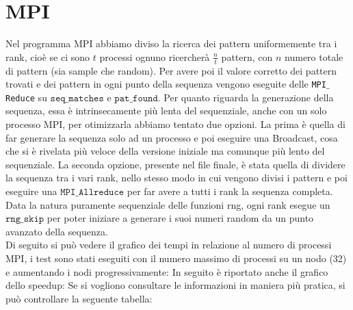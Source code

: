 \documentclass[12pt,openany]{report}
\begin{document}
\newpage
\section{MPI}
Nel programma MPI abbiamo diviso la ricerca dei pattern uniformemente tra i rank, cioè se ci sono $t$ processi ognuno ricercherà $\frac{n}{t}$ pattern, con $n$ numero totale di pattern (sia sample che random). Per avere poi il valore corretto dei pattern trovati e dei pattern in ogni punto della sequenza vengono eseguite delle \texttt{MPI$\_$Reduce} su $\texttt{seq$\_$matches}$ e $\texttt{pat$\_$found}$. Per quanto riguarda la generazione della sequenza, essa è intrinsecamente più lenta del sequenziale, anche con un solo processo MPI, per otimizzarla abbiamo tentato due opzioni. La prima è quella di far generare la sequenza solo ad un processo e poi eseguire una Broadcast, cosa che si è rivelata più veloce della versione iniziale ma comunque più lento del sequenziale. La seconda opzione, presente nel file finale, è stata quella di dividere la sequenza tra i vari rank, nello stesso modo in cui vengono divisi i pattern e poi eseguire una $\texttt{MPI$\_$Allreduce}$ per far avere a tutti i rank la sequenza completa. Data la natura puramente sequenziale delle funzioni rng, ogni rank esegue un $\texttt{rng$\_$skip}$ per poter iniziare a generare i suoi numeri random da un punto avanzato della sequenza.\\
Di seguito si può vedere il grafico dei tempi in relazione al numero di processi MPI, i test sono stati eseguiti con il numero massimo di processi su un nodo (32) e aumentando i nodi progressivamente:
In seguito è riportato anche il grafico dello speedup:
Se si vogliono consultare le informazioni in maniera più pratica, si può controllare la seguente tabella:


\newpage
\end{document}

